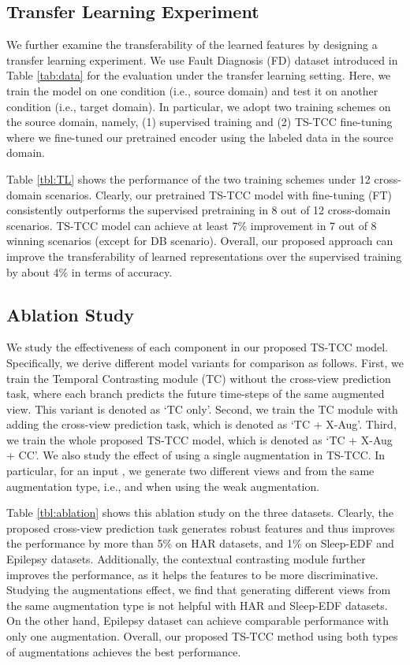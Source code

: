 \documentclass{article}
\begin{document}
 


\subsection{Transfer Learning Experiment}
We further examine the transferability of the learned features by designing a transfer learning experiment. We use Fault Diagnosis (FD) dataset introduced in Table \ref{tab:data} for the evaluation under the transfer learning setting. Here, we train the model on one condition (i.e., source domain) and test it on another condition (i.e., target domain). In particular, we adopt two training schemes on the source domain, namely, (1) supervised training and (2) TS-TCC fine-tuning where we fine-tuned our pretrained encoder using the labeled data in the source domain.  

Table \ref{tbl:TL} shows the performance of the two training schemes under 12 cross-domain scenarios. Clearly, our pretrained TS-TCC model with fine-tuning (FT) consistently outperforms the supervised pretraining in 8 out of 12 cross-domain scenarios. TS-TCC model can achieve at least 7\% improvement in 7 out of 8 winning scenarios (except for DB scenario). Overall, our proposed approach can improve the transferability of learned representations over the supervised training by about 4\% in terms of accuracy. 


\subsection{Ablation Study}
We study the effectiveness of each component in our proposed TS-TCC model.
Specifically, we derive different model variants for comparison as follows. First, we train the Temporal Contrasting module (TC) without the cross-view prediction task, where each branch predicts the future time-steps of the same augmented view. This variant is denoted as `TC only'. Second, we train the TC module with adding the cross-view prediction task, which is denoted as `TC + X-Aug'. Third, we train the whole proposed TS-TCC model, which is denoted as `TC + X-Aug + CC'. We also study the effect of using a single augmentation in TS-TCC. In particular, for an input , we generate two different views  and  from the same augmentation type, i.e.,  and  when using the weak augmentation.



Table \ref{tbl:ablation} shows this ablation study on the three datasets. 
Clearly, the proposed cross-view prediction task generates robust features and thus improves the performance by more than 5\% on HAR datasets, and 1\% on Sleep-EDF and Epilepsy datasets. Additionally, the contextual contrasting module further improves the performance, as it helps the features to be more discriminative. Studying the augmentations effect, we find that generating different views from the same augmentation type is not helpful with HAR and Sleep-EDF datasets. On the other hand, Epilepsy dataset can achieve comparable performance with only one augmentation. Overall, our proposed TS-TCC method using both types of augmentations achieves the best performance.
\end{document}
